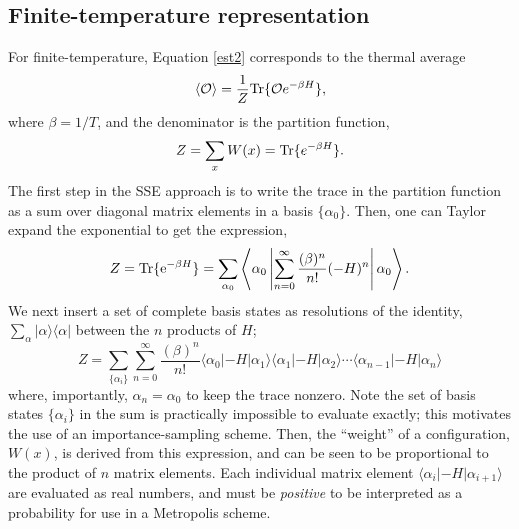 \documentclass[vecphys]{svmult}
\begin{document}
\subsection{Finite-temperature representation} \label{finiteT}

For finite-temperature, Equation \ref{est2} corresponds to the thermal average
\begin{equation}
\langle \mathcal{O} \rangle  = \frac{1}{Z} {\rm Tr} \{ \mathcal{O} e^{- \beta H} \}, \label{finiteTmeas}
\end{equation}
where $\beta = 1/T$, and the denominator is the partition function,
\begin{equation}
Z = \sum_x W(x) = {\rm Tr} \{ e^{- \beta H} \}. \label{MarkZ}
\end{equation}
The first step in the SSE approach is to write the trace in the partition function as a sum over diagonal matrix elements in a basis $\{ \alpha_0 \}$.  Then, one can Taylor expand the exponential to get the expression,
\begin{equation}
Z={\rm Tr} \{ {\rm e}^{-\beta H} \}=\sum_{\alpha_0} \left\langle{ \alpha_0 \left|{ \sum_{n=0}^{\infty} \frac{( \beta)^n}{n !} (-H)^n} \right| \alpha_0   }\right\rangle.
 \label{Zsse1}
\end{equation}
We next insert a set of complete basis states as resolutions of the identity, $\sum_{\alpha} |\alpha \rangle  \langle \alpha |$ between the $n$ products of $H$;
\begin{equation}
 Z=\sum_{\{ \alpha_i \}} \sum_{n=0}^{\infty} \frac{(\beta)^n}{n !} 
\langle \alpha_{0} | -H | \alpha_{1} \rangle \langle \alpha_1 | -H | \alpha_2\rangle  \cdots \langle \alpha_{n-1} | -H| \alpha_{n} \rangle
\label{Zsse2}
\end{equation}
where, importantly,  $\alpha_{n}=\alpha_0$ to keep the trace nonzero.  
Note the set of basis states $\{ \alpha_i \}$ in the sum is practically impossible to evaluate exactly; this motivates the use of an importance-sampling scheme.  Then,
the ``weight'' of a configuration, $W(x)$, is derived from this expression, and can be seen to be proportional to the product of $n$ matrix elements.  Each individual matrix element $\langle{\alpha_{i} \left| {-H} \right| \alpha_{i+1}   }\rangle$ are evaluated as real numbers, and must be {\em positive} to be interpreted as a probability  for use in a Metropolis scheme.  
\end{document}
